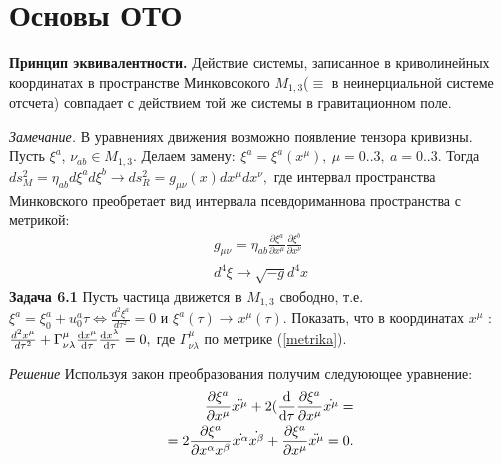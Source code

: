 \documentclass[a4paper]{article}
\begin{document}
\section{Основы ОТО}
\textbf{Принцип эквивалентности.} 
Действие системы, записанное в криволинейных координатах в пространстве Минковсокого $M_{1,3}$($\equiv$ в неинерциальной системе отсчета) совпадает с действием той же системы в гравитационном поле.
\par
\textit{Замечание.}
В уравнениях движения возможно появление  тензора кривизны. Пусть $\xi^a$, $\nu_{ab} \in M_{1,3}.$ Делаем замену: $\xi^a = \xi^a(x^\mu),{~} \mu = 0..3, {~} a= 0..3.$ Тогда $ds^2_{M} = \eta_{ab} d\xi^a d\xi^b \rightarrow ds_{R}^2 = g_{\mu \nu}(x) dx^\mu dx^\nu,$ где интервал пространства Минковского преобретает вид интервала псевдориманнова пространства с метрикой:
\begin{align} \label{metrika}
g_{\mu \nu} = \eta_{a b} \frac{\partial \xi^a}{\partial x^\mu} \frac{\partial \xi^b}{\partial x^\nu} \\
d^4 \xi \rightarrow \sqrt{-g} d^4 x
\end{align} 
\textbf{Задача 6.1} 
Пусть частица движется в $M_{1,3}$ свободно, т.е. $\xi^a = \xi^a_0 + u^a_0 \tau \Leftrightarrow \frac{d^2\xi^a}{d\tau^2} = 0$ и $ \xi^a(\tau) \rightarrow x^\mu(\tau)$. Показать, что в координатах $x^\mu$ : $\frac{d^2 x^\mu}{d \tau^2} + \Gamma^\mu_{\nu \lambda} \dv{x^\mu}{\tau} \dv{x^\lambda}{ \tau} = 0,$ где $\Gamma^\mu_{\nu \lambda}$ по метрике (\ref{metrika}). 
\par
\textit{Решение} Используя закон преобразования получим следуюющее уравнение:
\begin{align}
\pdv{\xi^a}{x^\mu} \ddot{x^\mu} + 2 (\dv{}{\tau} {\pdv{\xi^a}{x^\mu}} \dot{x^\mu} = \\
= 2  \pdv{\xi^a}{x^\alpha x^\beta} \dot{x^\alpha} \dot{x^\beta} + \pdv{\xi^a}{x^\mu} \ddot{x^\mu} = 0.
\end{align}
\end{document}
